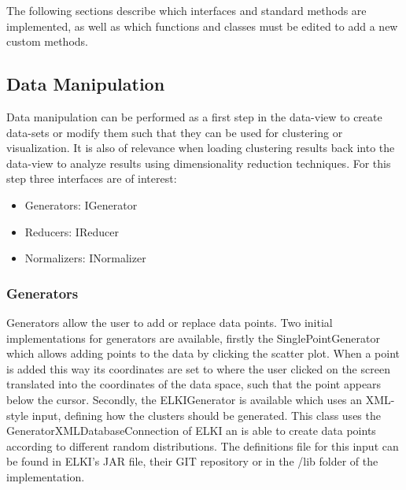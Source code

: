 \documentclass[
	a4paper,
	english,
	twoside,
	openright,               
	11pt                            
	]{report}
\begin{document}
The following sections describe which interfaces and standard methods are implemented, as well as which functions and classes must be edited to add a new custom methods.

\subsection{Data Manipulation}

Data manipulation can be performed as a first step in the data-view to create data-sets or modify them such that they can be used for clustering or visualization. It is also of relevance when loading clustering results back into the data-view to analyze results using dimensionality reduction techniques. For this step three interfaces are of interest:

\begin{itemize}
  \item Generators: IGenerator
  \item Reducers: IReducer
  \item Normalizers: INormalizer
\end{itemize}

\subsubsection{Generators}
Generators allow the user to add or replace data points. Two initial implementations for generators are available, firstly the SinglePointGenerator which allows adding points to the data by clicking the scatter plot. When a point is added this way its coordinates are set to where the user clicked on the screen translated into the coordinates of the data space, such that the point appears below the cursor. Secondly, the ELKIGenerator is available which uses an XML-style input, defining how the clusters should be generated. This class uses the GeneratorXMLDatabaseConnection of ELKI \cite{10.1007/978-3-540-69497-7_41} an is able to create data points according to different random distributions. The definitions file for this input can be found in ELKI's JAR file, their GIT repository \cite{elkixml} or in the /lib folder of the implementation.

\end{document}
